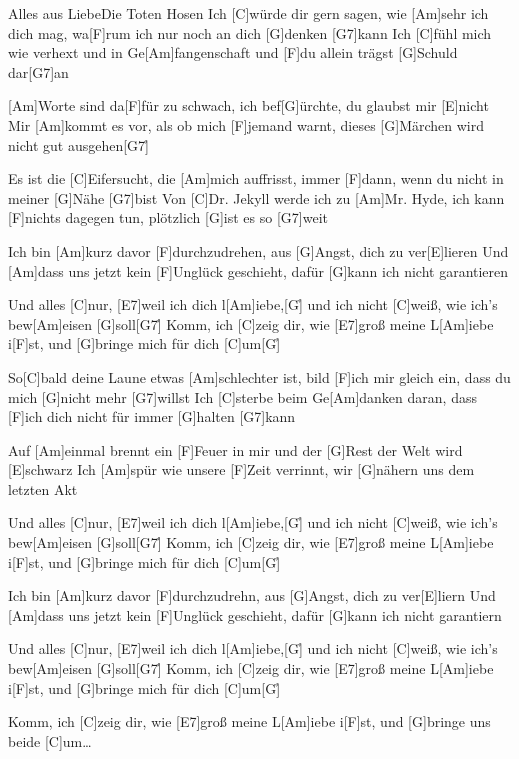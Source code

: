 \documentclass[../main.tex]{subfiles}
\begin{document}
\begin{song}{Alles aus Liebe}{Die Toten Hosen}{}        
Ich [C]würde dir gern sagen, wie [Am]sehr ich dich mag,
wa[F]rum ich nur noch an dich [G]denken [G7]kann
Ich [C]fühl mich wie verhext und in Ge[Am]fangenschaft
und [F]du allein trägst [G]Schuld dar[G7]an

[Am]Worte sind da[F]für zu schwach, ich bef[G]{ü}rchte, du glaubst mir [E]nicht
Mir [Am]kommt es vor, als ob mich [F]jemand warnt, dieses [G]Märchen wird nicht gut ausgehen[G7]{\h}

Es ist die [C]Eifersucht, die [Am]mich auffrisst,
immer [F]dann, wenn du nicht in meiner [G]Nähe [G7]bist
Von [C]Dr. Jekyll werde ich zu [Am]Mr. Hyde,
ich kann [F]nichts dagegen tun, plötzlich [G]ist es so [G7]weit

Ich bin [Am]kurz davor [F]durchzudrehen, aus [G]Angst, dich zu ver[E]lieren
Und [Am]dass uns jetzt kein [F]Unglück geschieht, dafür [G]kann ich nicht garantieren

Und alles [C]nur, [E7]weil ich dich l[Am]iebe,[G]{\h}
und ich nicht [C]weiß, wie ich's bew[Am]eisen [G]soll[G7]{\h}
Komm, ich [C]zeig dir, wie [E7]groß meine L[Am]iebe i[F]st,
und [G]bringe mich für dich [C]um[G]{\h}

So[C]bald deine Laune etwas [Am]schlechter ist,
bild [F]ich mir gleich ein, dass du mich [G]nicht mehr [G7]willst
Ich [C]sterbe beim Ge[Am]danken daran,
dass [F]ich dich nicht für immer [G]halten [G7]kann

Auf [Am]einmal brennt ein [F]Feuer in mir und der [G]Rest der Welt wird [E]schwarz
Ich [Am]spür wie unsere [F]Zeit verrinnt, wir [G]nähern uns dem letzten Akt

Und alles [C]nur, [E7]weil ich dich l[Am]iebe,[G]{\h}
und ich nicht [C]weiß, wie ich's bew[Am]eisen [G]soll[G7]{\h}
Komm, ich [C]zeig dir, wie [E7]groß meine L[Am]iebe i[F]st,
und [G]bringe mich für dich [C]um[G]{\h}

Ich bin [Am]kurz davor [F]durchzudrehn, aus [G]Angst, dich zu ver[E]liern
Und [Am]dass uns jetzt kein [F]Unglück geschieht, dafür [G]kann ich nicht garantiern

Und alles [C]nur, [E7]weil ich dich l[Am]iebe,[G]{\h}
und ich nicht [C]weiß, wie ich's bew[Am]eisen [G]soll[G7]{\h}
Komm, ich [C]zeig dir, wie [E7]groß meine L[Am]iebe i[F]st,
und [G]bringe mich für dich [C]um[G]{\h}

Komm, ich [C]zeig dir, wie [E7]groß meine L[Am]iebe i[F]st, und [G]bringe uns beide [C]um…
\end{song}
\end{document}
